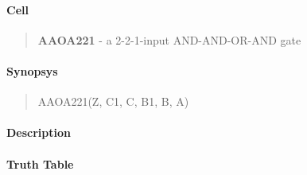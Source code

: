 \label{AAOA221}
\paragraph{Cell}
\begin{quote}
    \textbf{AAOA221} - a 2-2-1-input AND-AND-OR-AND gate
\end{quote}

\paragraph{Synopsys}
\begin{quote}
    AAOA221(Z, C1, C, B1, B, A)
\end{quote}

\paragraph{Description}

%

\paragraph{Truth Table}
%

